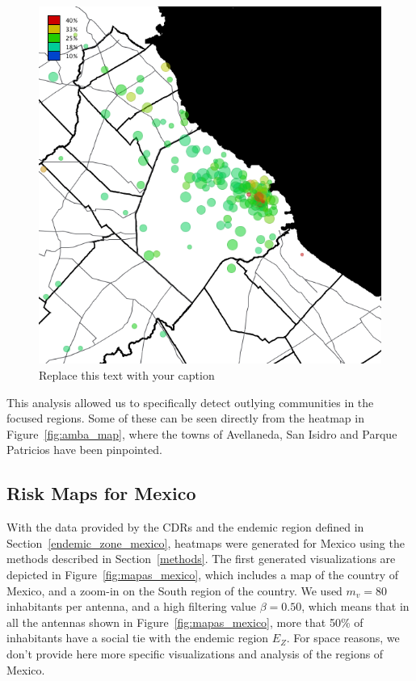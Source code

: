 \begin{figure}[h!]
	\begin{center}
		\includegraphics[width=0.35\columnwidth]{figures/201112_hi_res_amba_usuarios_proporcion_circulos_beta20/201112_hi_res_amba_usuarios_proporcion_circulos_beta20}
		\caption{Replace this text with your caption%
		}
	\end{center}
\end{figure}

This analysis allowed us to specifically detect outlying communities in the focused regions. Some of these can be seen directly from the heatmap in Figure~\ref{fig:amba_map}, where the towns of Avellaneda, San Isidro and Parque Patricios have been pinpointed.




\subsection{Risk Maps for Mexico}

With the data provided by the CDRs and the endemic region defined in Section~\ref{endemic_zone_mexico}, heatmaps were generated for Mexico using the methods described in Section~\ref{methods}. The first generated visualizations are depicted in Figure~\ref{fig:mapas_mexico},
which includes a map of the country of Mexico, and a zoom-in on the South region of the country.
We used $m_v = 80$ inhabitants per antenna, and a high filtering value $\beta = 0.50$, which 
means that in all the antennas shown in Figure~\ref{fig:mapas_mexico},
more that 50\% of inhabitants have a social tie with the endemic region $E_Z$.
For space reasons, we don't provide here more specific visualizations and analysis of the regions of Mexico.

